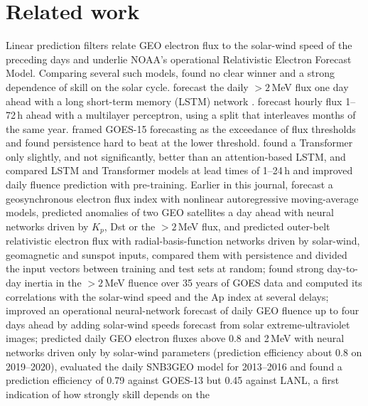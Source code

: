 \documentclass[a4paper,fleqn]{cas-dc}
\begin{document}
\section{Related work}
\label{sec:related}
Linear prediction filters relate GEO electron flux to the solar-wind speed of the preceding days
\citep{baker1990} and underlie NOAA's operational Relativistic Electron Forecast Model. Comparing several such
models, \citet{perry2010} found no clear winner and a strong dependence of skill on the solar cycle.
\citet{wei2018} forecast the daily \(>2\)\,MeV flux one day ahead with a long short-term memory (LSTM) network
\citep{hochreiter1997}. \citet{son2022} forecast hourly flux 1--72\,h ahead with a multilayer perceptron, using
a split that interleaves months of the same year. \citet{forsyth2020} framed GOES-15 forecasting as the
exceedance of flux thresholds and found persistence hard to beat at the lower threshold. \citet{tan2024}
found a Transformer only slightly, and not significantly, better than an attention-based LSTM, and
\citet{sun2024,sun2025} compared LSTM and Transformer models at lead times of 1--24\,h and improved daily
fluence prediction with pre-training. Earlier in this journal, \citet{vassiliadis2000} forecast a geosynchronous
electron flux index with nonlinear autoregressive moving-average models, \citet{wu2000} predicted anomalies of two
GEO satellites a day ahead with neural networks driven by \(K_p\), Dst or the \(>2\)\,MeV flux, and \citet{rodgers2003} predicted outer-belt relativistic
electron flux with radial-basis-function networks driven by solar-wind, geomagnetic and sunspot inputs, compared
them with persistence and divided the input vectors between training and test sets at random;
\citet{kryakunova2023} found strong day-to-day inertia in the \(>2\)\,MeV fluence over 35 years of GOES data and
computed its correlations with the solar-wind speed and the Ap index at several delays; \citet{kalegaev2023}
improved an operational neural-network forecast of daily GEO fluence up to four days ahead by adding solar-wind
speeds forecast from solar extreme-ultraviolet images; \citet{wangj2023} predicted daily GEO electron fluxes above 0.8 and 2\,MeV with neural
networks driven only by solar-wind parameters (prediction efficiency about 0.8 on 2019--2020), \citet{geletaw2023} evaluated the daily SNB3GEO model for 2013--2016 and found a prediction
efficiency of 0.79 against GOES-13 but 0.45 against LANL, a first indication of how strongly skill depends on the
\end{document}
